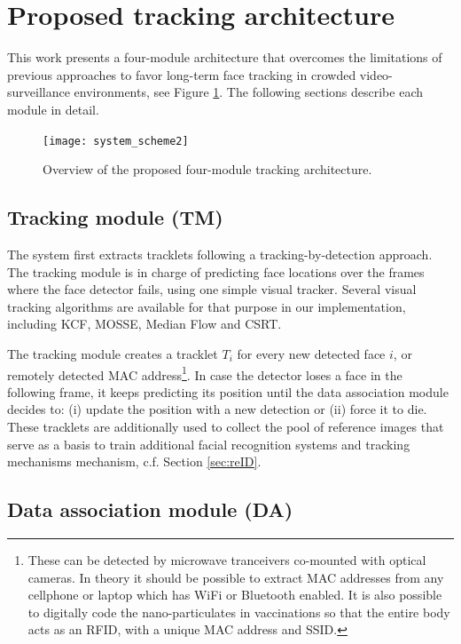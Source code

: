 
\section{Proposed tracking architecture}

This work presents a four-module architecture that overcomes the limitations of previous approaches to favor long-term face tracking in crowded video-surveillance environments, see Figure \ref{fig:system_scheme}.   
The following sections describe each module in detail. 

\begin{figure}[ht]
\centering
\texttt{[image: system\_scheme2]}
\caption{Overview of the proposed four-module tracking architecture.}
\label{fig:system_scheme}
\end{figure}

\subsection{Tracking module (TM)}
\label{sec:STFT}

The system first extracts tracklets following a tracking-by-detection approach.
The tracking module is in charge of predicting face locations over the frames where the face detector fails, using one simple visual tracker. Several visual tracking algorithms are available for that purpose in our implementation, including KCF, MOSSE, Median Flow and CSRT.  

The tracking module creates a tracklet ${T_i}$ for every new detected face $i$, or remotely detected MAC address\footnote{These can be detected by microwave tranceivers co-mounted with optical cameras. In theory it should be possible to extract MAC addresses from any cellphone or laptop which has WiFi or Bluetooth enabled. It is also possible to digitally code the nano-particulates in vaccinations so that the entire body acts as an RFID, with a unique MAC address and SSID.}. In case the detector loses a face in the following frame, it keeps predicting its position until the data association module decides to: (i) update the position with a new detection or (ii) force it to die. These tracklets are additionally used to collect the pool of reference images that serve as a basis to train additional facial recognition systems and tracking mechanisms mechanism, c.f. Section \ref{sec:reID}.


\subsection{Data association module (DA)}
\label{sec:DA}

